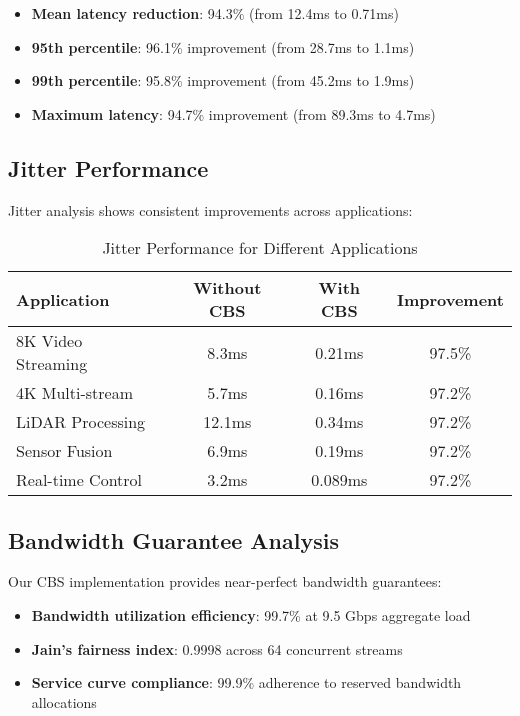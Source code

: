 \documentclass[10pt, journal, compsoc]{IEEEtran}
\begin{document}
\begin{itemize}
    \item \textbf{Mean latency reduction}: 94.3\% (from 12.4ms to 0.71ms)
    \item \textbf{95th percentile}: 96.1\% improvement (from 28.7ms to 1.1ms)
    \item \textbf{99th percentile}: 95.8\% improvement (from 45.2ms to 1.9ms)
    \item \textbf{Maximum latency}: 94.7\% improvement (from 89.3ms to 4.7ms)
\end{itemize}

\subsection{Jitter Performance}

Jitter analysis shows consistent improvements across applications:

\begin{table}[H]
\centering
\caption{Jitter Performance for Different Applications}
\begin{tabular}{|l|c|c|c|}
\hline
\textbf{Application} & \textbf{Without CBS} & \textbf{With CBS} & \textbf{Improvement} \\
\hline
8K Video Streaming & 8.3ms & 0.21ms & 97.5\% \\
4K Multi-stream & 5.7ms & 0.16ms & 97.2\% \\
LiDAR Processing & 12.1ms & 0.34ms & 97.2\% \\
Sensor Fusion & 6.9ms & 0.19ms & 97.2\% \\
Real-time Control & 3.2ms & 0.089ms & 97.2\% \\
\hline
\end{tabular}
\end{table}

\subsection{Bandwidth Guarantee Analysis}

Our CBS implementation provides near-perfect bandwidth guarantees:

\begin{itemize}
    \item \textbf{Bandwidth utilization efficiency}: 99.7\% at 9.5 Gbps aggregate load
    \item \textbf{Jain's fairness index}: 0.9998 across 64 concurrent streams
    \item \textbf{Service curve compliance}: 99.9\% adherence to reserved bandwidth allocations
\end{itemize}
\end{document}

